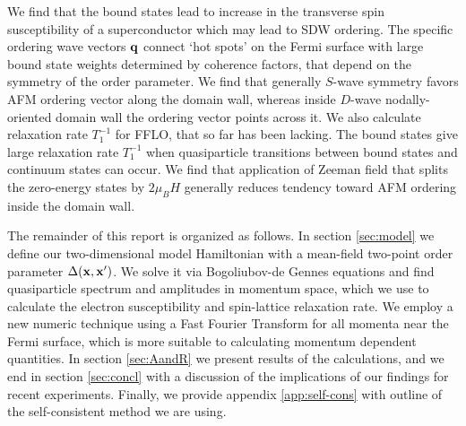 \documentclass[prb,aps,showpacs,amsmath,twocolumn,10pt]{revtex4-1}
\begin{document}

We find that the %
bound states lead to increase in the transverse spin susceptibility of
a superconductor 
which may lead to SDW ordering. %
The specific ordering wave vectors ${\bf q}$ connect `hot spots' on the Fermi surface
with large bound state weights determined by coherence factors, 
that depend on the symmetry of the order parameter. 
We find that generally $S$-wave symmetry favors AFM ordering vector along the
domain wall, whereas inside $D$-wave nodally-oriented domain wall the 
ordering vector points across it. %
We also calculate relaxation rate $T_1^{-1}$ for FFLO, that so far has been lacking. 
The bound states give large relaxation rate $T_1^{-1}$ %
when quasiparticle transitions between bound states %
and continuum states can occur. 
We find that application of Zeeman field that splits the zero-energy states by $2\mu_B H$ 
generally reduces tendency toward AFM ordering inside the domain wall. 

The remainder of this report is organized as follows. In section
\ref{sec:model} we define our two-dimensional model Hamiltonian 
with a mean-field two-point order parameter $\Delta({\bf x},{\bf x}')$. 
We solve it via Bogoliubov-de Gennes equations and find quasiparticle spectrum and
amplitudes in momentum space, which we use to calculate the electron susceptibility 
and spin-lattice relaxation rate. We employ a new numeric
technique using a Fast Fourier Transform for all momenta near the Fermi surface, which is more suitable to calculating
momentum dependent quantities. 
In section \ref{sec:AandR} we present results of the calculations, and we end
in section \ref{sec:concl} with a discussion of the implications of our findings for recent experiments. 
Finally, we provide appendix \ref{app:self-cons} with outline of the self-consistent 
method we are using.
\end{document}
